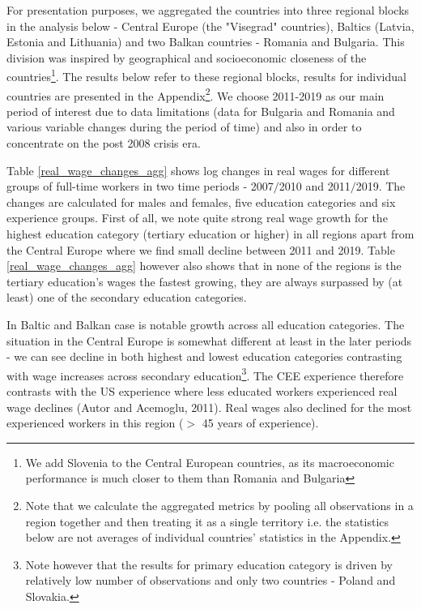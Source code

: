 \documentclass{article}
\begin{document}
For presentation purposes, we aggregated the countries into three regional blocks in the analysis below - Central Europe (the "Visegrad" countries), Baltics (Latvia, Estonia and Lithuania) and two Balkan countries - Romania and Bulgaria. This division was inspired by geographical and socioeconomic closeness of the countries\footnote{We add Slovenia to the Central European countries, as its macroeconomic performance is much closer to them than Romania and Bulgaria}. The results below refer to these regional blocks, results for individual countries are presented in the Appendix\footnote{Note that we calculate the aggregated metrics by pooling all observations in a region together and then treating it as a single territory i.e. the statistics below are not averages of individual countries' statistics in the Appendix.}. We choose 2011-2019 as our main period of interest due to data limitations (data for Bulgaria and Romania and various variable changes during the period of time) and also in order to concentrate on the post 2008 crisis era.

Table \ref{real_wage_changes_agg} shows log changes in real wages for different groups of full-time workers in two time periods - 2007$/$2010 and 2011$/$2019. The changes are calculated for males and females, five education categories and six experience groups. First of all, we note quite strong real wage growth for the highest education category (tertiary education or higher) in all regions apart from the Central Europe where we find small decline between 2011 and 2019. Table \ref{real_wage_changes_agg} however also shows that in none of the regions is the tertiary education's wages the fastest growing, they are always surpassed by (at least) one of the secondary education categories.

In Baltic and Balkan case is notable growth across all education categories. The situation in the Central Europe is somewhat different at least in the later periods - we can see decline in both highest and lowest education categories contrasting with wage increases across secondary education\footnote{Note however that the results for primary education category is driven by relatively low number of observations and only two countries - Poland and Slovakia.}. The CEE experience therefore contrasts with the US experience where less educated workers experienced real wage declines (Autor and Acemoglu, 2011).
Real wages also declined for the most experienced workers in this region ($>$ 45 years of experience).
\end{document}
